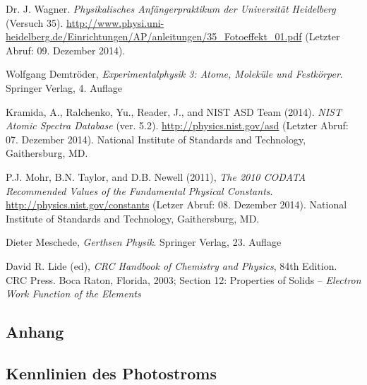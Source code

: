 \documentclass[11pt, a4paper]{article}
\numberwithin{equation}{section}
\begin{document}
\vspace{\fill}
\begin{thebibliography}{9}
	Dr. J. Wagner.
	\emph{Physikalisches Anfängerpraktikum der Universität Heidelberg} (Versuch 35).
	\url{http://www.physi.uni-heidelberg.de/Einrichtungen/AP/anleitungen/35_Fotoeffekt_01.pdf} (Letzter Abruf: 09. Dezember 2014).

	Wolfgang Demtröder,
	\emph{Experimentalphysik 3: Atome, Moleküle und Festkörper}.
	Springer Verlag,
	4. Auflage

	Kramida, A., Ralchenko, Yu., Reader, J., and NIST ASD Team (2014).
	\emph{NIST Atomic Spectra Database} (ver. 5.2).
	\url{http://physics.nist.gov/asd} (Letzter Abruf: 07. Dezember 2014).
	National Institute of Standards and Technology, Gaithersburg, MD.

	P.J. Mohr, B.N. Taylor, and D.B. Newell (2011),
	\emph{The 2010 CODATA Recommended Values of the Fundamental Physical Constants}.
	\url{http://physics.nist.gov/constants} (Letzer Abruf: 08. Dezember 2014).
	National Institute of Standards and Technology, Gaithersburg, MD.
	
	Dieter Meschede,
	\emph{Gerthsen Physik}.
	Springer Verlag,
	23. Auflage

	David R. Lide (ed),
	\emph{CRC Handbook of Chemistry and Physics},
	84th Edition. CRC Press. Boca Raton, Florida, 2003;
	Section 12: Properties of Solids --
	\emph{Electron Work Function of the Elements}
 
\end{thebibliography}

\clearpage

\begin{appendix}
\section{Anhang}
\subsection{Kennlinien des Photostroms}
\label{app:kennlinien}


\end{appendix}
\end{document}
